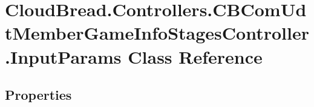 \hypertarget{class_cloud_bread_1_1_controllers_1_1_c_b_com_udt_member_game_info_stages_controller_1_1_input_params}{}\section{Cloud\+Bread.\+Controllers.\+C\+B\+Com\+Udt\+Member\+Game\+Info\+Stages\+Controller.\+Input\+Params Class Reference}
\label{class_cloud_bread_1_1_controllers_1_1_c_b_com_udt_member_game_info_stages_controller_1_1_input_params}
\subsection*{Properties}
